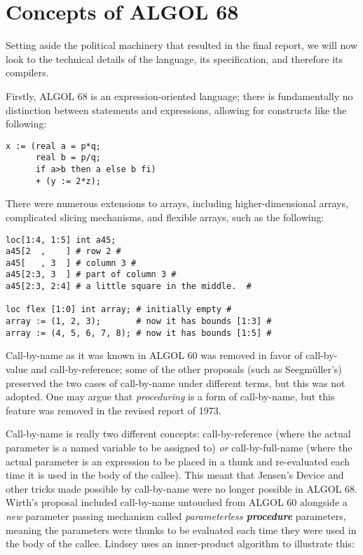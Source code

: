 \section{Concepts of ALGOL 68}

Setting aside the political machinery that resulted in the final report,
we will now look to the technical details of the language, its specification,
and therefore its compilers.

Firstly, ALGOL 68 is an expression-oriented language;
there is fundamentally no distinction between statements and expressions,
allowing for constructs like the following:

\begin{lstlisting}[language=algol,frame=single]
x := (real a = p*q;
      real b = p/q;
      if a>b then a else b fi)
      + (y := 2*z); 
\end{lstlisting}

There were numerous extensions to arrays, including higher-dimensional arrays,
complicated slicing mechanisms, and flexible arrays, such as the following:
\begin{lstlisting}[language=algol,frame=single]
loc[1:4, 1:5] int a45; 
a45[2  ,    ] # row 2 #
a45[   , 3  ] # column 3 #
a45[2:3, 3  ] # part of column 3 #
a45[2:3, 2:4] # a little square in the middle.  #

loc flex [1:0] int array; # initially empty #
array := (1, 2, 3);       # now it has bounds [1:3] #
array := (4, 5, 6, 7, 8); # now it has bounds [1:5] #
\end{lstlisting}

Call-by-name as it was known in ALGOL 60 was removed in favor of
call-by-value and call-by-reference; some of the other proposals
(such as Seegm{\"u}ller's) preserved the two cases of call-by-name
under different terms, but this was not adopted.
One may argue that \textit{proceduring} is a form of call-by-name,
but this feature was removed in the revised report of 1973.

Call-by-name is really two different concepts:
call-by-reference (where the actual parameter is a named variable to
be assigned to) \textit{or} call-by-full-name (where the actual parameter
is an expression to be placed in a thunk and re-evaluated each time
it is used in the body of the callee). This meant that Jensen's Device
and other tricks made possible by call-by-name were no longer possible
in ALGOL 68.
Wirth's proposal included call-by-name untouched from ALGOL 60 alongside
a \textit{new} parameter passing mechanism called \textit{parameterless \textbf{procedure}}
parameters, meaning the parameters were thunks to be evaluated each time they
were used in the body of the callee\cite{a_history_of_algol_68_1993}.
Lindsey uses an inner-product algorithm to illustrate this:

